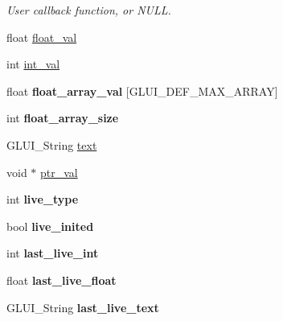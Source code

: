 \begin{DoxyCompactItemize}
\begin{DoxyCompactList}\small\item\em User callback function, or N\-U\-L\-L. \end{DoxyCompactList}\item 
float \hyperlink{classGLUI__Control_ac69b8e62a6f4f16c83b70a64f73d7a1c}{float\-\_\-val}
\item 
int \hyperlink{classGLUI__Control_a4a890b5b5a854b34200b5e63f1069b4e}{int\-\_\-val}
\item 
\hypertarget{classGLUI__Control_a6d2cc0faaa678706939ac775c523871a}{float {\bfseries float\-\_\-array\-\_\-val} \mbox{[}G\-L\-U\-I\-\_\-\-D\-E\-F\-\_\-\-M\-A\-X\-\_\-\-A\-R\-R\-A\-Y\mbox{]}}\label{classGLUI__Control_a6d2cc0faaa678706939ac775c523871a}

\item 
\hypertarget{classGLUI__Control_a504f6aff85729e665fa8664d170d9878}{int {\bfseries float\-\_\-array\-\_\-size}}\label{classGLUI__Control_a504f6aff85729e665fa8664d170d9878}

\item 
G\-L\-U\-I\-\_\-\-String \hyperlink{classGLUI__Control_af0d60e9736f4dbc34e9a536e75876d72}{text}
\item 
void $\ast$ \hyperlink{classGLUI__Control_a0890ea809b8d980695939e1d92a0af47}{ptr\-\_\-val}
\item 
\hypertarget{classGLUI__Control_a8ba7cae809a47dd870592aa2cc85483b}{int {\bfseries live\-\_\-type}}\label{classGLUI__Control_a8ba7cae809a47dd870592aa2cc85483b}

\item 
\hypertarget{classGLUI__Control_a74977797cf84a38ef78de8c548bc2d25}{bool {\bfseries live\-\_\-inited}}\label{classGLUI__Control_a74977797cf84a38ef78de8c548bc2d25}

\item 
\hypertarget{classGLUI__Control_abef31d8d51c8088afd6ac96ec7b596bf}{int {\bfseries last\-\_\-live\-\_\-int}}\label{classGLUI__Control_abef31d8d51c8088afd6ac96ec7b596bf}

\item 
\hypertarget{classGLUI__Control_aa9ebadbed670a1fa061918705083db57}{float {\bfseries last\-\_\-live\-\_\-float}}\label{classGLUI__Control_aa9ebadbed670a1fa061918705083db57}

\item 
\hypertarget{classGLUI__Control_ac77569805eb6ccfce3f4ff1d09c309b6}{G\-L\-U\-I\-\_\-\-String {\bfseries last\-\_\-live\-\_\-text}}\label{classGLUI__Control_ac77569805eb6ccfce3f4ff1d09c309b6}


\end{DoxyCompactItemize}

